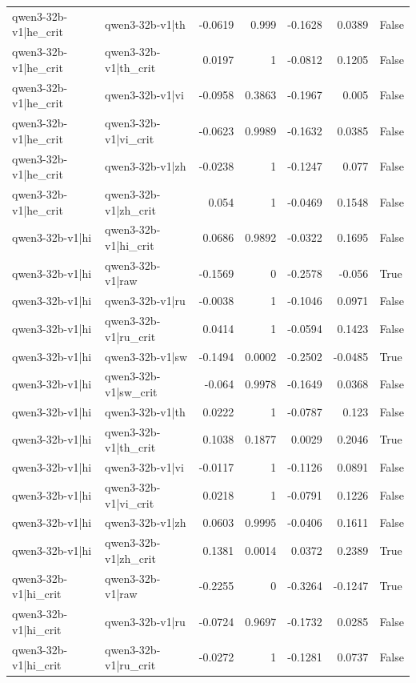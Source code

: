 \begin{table}
\begin{tabular}{l l r r r r l}
qwen3-32b-v1|he_crit & qwen3-32b-v1|th & -0.0619 & 0.999 & -0.1628 & 0.0389 & False \\
qwen3-32b-v1|he_crit & qwen3-32b-v1|th_crit & 0.0197 & 1 & -0.0812 & 0.1205 & False \\
qwen3-32b-v1|he_crit & qwen3-32b-v1|vi & -0.0958 & 0.3863 & -0.1967 & 0.005 & False \\
qwen3-32b-v1|he_crit & qwen3-32b-v1|vi_crit & -0.0623 & 0.9989 & -0.1632 & 0.0385 & False \\
qwen3-32b-v1|he_crit & qwen3-32b-v1|zh & -0.0238 & 1 & -0.1247 & 0.077 & False \\
qwen3-32b-v1|he_crit & qwen3-32b-v1|zh_crit & 0.054 & 1 & -0.0469 & 0.1548 & False \\
qwen3-32b-v1|hi & qwen3-32b-v1|hi_crit & 0.0686 & 0.9892 & -0.0322 & 0.1695 & False \\
qwen3-32b-v1|hi & qwen3-32b-v1|raw & -0.1569 & 0 & -0.2578 & -0.056 & True \\
qwen3-32b-v1|hi & qwen3-32b-v1|ru & -0.0038 & 1 & -0.1046 & 0.0971 & False \\
qwen3-32b-v1|hi & qwen3-32b-v1|ru_crit & 0.0414 & 1 & -0.0594 & 0.1423 & False \\
qwen3-32b-v1|hi & qwen3-32b-v1|sw & -0.1494 & 0.0002 & -0.2502 & -0.0485 & True \\
qwen3-32b-v1|hi & qwen3-32b-v1|sw_crit & -0.064 & 0.9978 & -0.1649 & 0.0368 & False \\
qwen3-32b-v1|hi & qwen3-32b-v1|th & 0.0222 & 1 & -0.0787 & 0.123 & False \\
qwen3-32b-v1|hi & qwen3-32b-v1|th_crit & 0.1038 & 0.1877 & 0.0029 & 0.2046 & True \\
qwen3-32b-v1|hi & qwen3-32b-v1|vi & -0.0117 & 1 & -0.1126 & 0.0891 & False \\
qwen3-32b-v1|hi & qwen3-32b-v1|vi_crit & 0.0218 & 1 & -0.0791 & 0.1226 & False \\
qwen3-32b-v1|hi & qwen3-32b-v1|zh & 0.0603 & 0.9995 & -0.0406 & 0.1611 & False \\
qwen3-32b-v1|hi & qwen3-32b-v1|zh_crit & 0.1381 & 0.0014 & 0.0372 & 0.2389 & True \\
qwen3-32b-v1|hi_crit & qwen3-32b-v1|raw & -0.2255 & 0 & -0.3264 & -0.1247 & True \\
qwen3-32b-v1|hi_crit & qwen3-32b-v1|ru & -0.0724 & 0.9697 & -0.1732 & 0.0285 & False \\
qwen3-32b-v1|hi_crit & qwen3-32b-v1|ru_crit & -0.0272 & 1 & -0.1281 & 0.0737 & False \\

\end{tabular}
\end{table}
